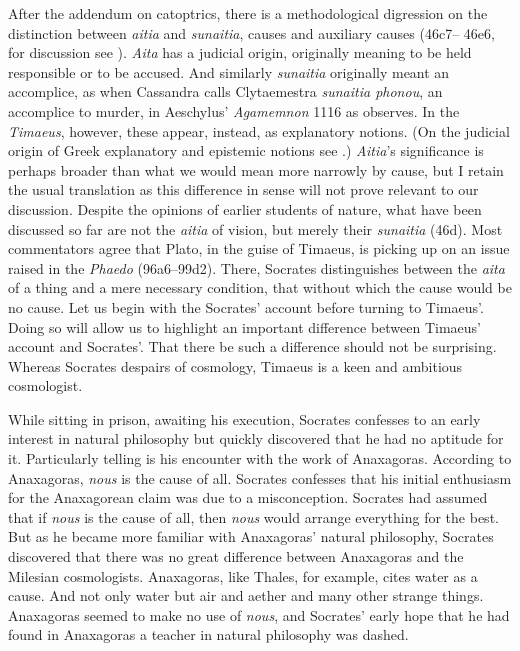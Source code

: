After the addendum on catoptrics, there is a methodological digression on the distinction between \emph{aitia} and \emph{sunaitia}, causes and auxiliary causes (46c7–
46e6, for discussion see \citealt{Strange:1985aa}). \emph{Aita} has a judicial origin, originally meaning to be held responsible or to be accused. And similarly \emph{sunaitia} originally meant an accomplice, as when Cassandra calls Clytaemestra \emph{sunaitia phonou}, an accomplice to murder, in Aeschylus' \emph{Agamemnon} 1116 as \citet[291]{Taylor:1928qb} observes. In the \emph{Timaeus}, however, these appear, instead, as explanatory notions. (On the judicial origin of Greek explanatory and epistemic notions see \citealt[chapter 4]{Lloyd:1979lc}.) \emph{Aitia}'s significance is perhaps broader than what we would mean more narrowly by cause, but I retain the usual translation as this difference in sense will not prove relevant to our discussion. Despite the opinions of earlier students of nature, what have been discussed so far are not the \emph{aitia} of vision, but merely their \emph{sunaitia} (46d). Most commentators agree that Plato, in the guise of Timaeus, is picking up on an issue raised in the \emph{Phaedo} (96a6--99d2). There, Socrates distinguishes between the \emph{aita} of a thing and a mere necessary condition, that without which the cause would be no cause. Let us begin with the Socrates' account before turning to Timaeus'. Doing so will allow us to highlight an important difference between Timaeus' account and Socrates'. That there be such a difference should not be surprising. Whereas Socrates despairs of cosmology, Timaeus is a keen and ambitious cosmologist.

While sitting in prison, awaiting his execution, Socrates confesses to an early interest in natural philosophy but quickly discovered that he had no aptitude for it. Particularly telling is his encounter with the work of Anaxagoras. According to Anaxagoras, \emph{nous} is the cause of all. Socrates confesses that his initial enthusiasm for the Anaxagorean claim was due to a misconception. Socrates had assumed that if \emph{nous} is the cause of all, then \emph{nous} would arrange everything for the best. But as he became more familiar with Anaxagoras' natural philosophy, Socrates discovered that there was no great difference between Anaxagoras and the Milesian cosmologists. Anaxagoras, like Thales, for example, cites water as a cause. And not only water but air and aether and many other strange things. Anaxagoras seemed to make no use of \emph{nous}, and Socrates' early hope that he had found in Anaxagoras a teacher in natural philosophy was dashed. 

